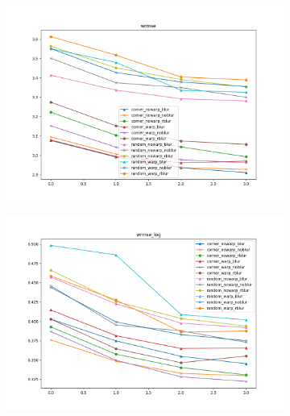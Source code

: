 \begin{figure}
\begin{adjustwidth}{-0.2\textwidth}{-0.2\textwidth}
        \begin{subfigure}{0.6\textwidth}
            \includegraphics[width=\textwidth]{figs/wrmse}
        \end{subfigure}
        \hspace{0cm}
        \begin{subfigure}{0.6\textwidth}
            \includegraphics[width=\textwidth]{figs/wrmse_log}
        \end{subfigure}
        \hspace{0cm}
        \begin{subfigure}{0.6\textwidth}

\end{subfigure}
\end{adjustwidth}
\end{figure}
